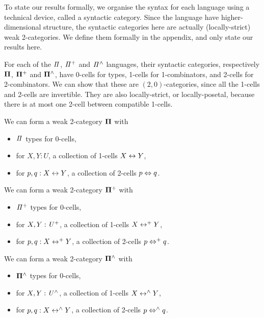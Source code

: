 To state our results formally, we organise the syntax for each language using a technical device, called a syntactic
category. Since the language have higher-dimensional structure, the syntactic categories here are actually
(locally-strict) weak 2-categories. We define them formally in the appendix, and only state our results here.

For each of the $\mathit{\Pi}$, $\mathit{{\Pi}^{+}}$ and $\mathit{{\Pi}^{\wedge}}$ languages, their syntactic categories, respectively $\mathbf{\Pi}$,
$\mathbf{\Pi^{+}}$ and $\mathbf{\Pi^{\wedge}}$, have 0-cells for types, 1-cells for 1-combinators, and 2-cells for 2-combinators. We can
show that these are $(2,0)$-categories, since all the 1-cells and 2-cells are invertible. They are also locally-strict,
or locally-posetal, because there is at most one 2-cell between compatible 1-cells.

\begin{toappendix}
  \begin{proposition}
    We can form a weak 2-category $\mathbf{\Pi}$ with
    \begin{itemize}
      \item $\mathit{\Pi}$ types for 0-cells,
      \item for $X, Y : U$, a collection of 1-cells $X \mathrel{\leftrightarrow} Y$,
      \item for $p, q : X \mathrel{\leftrightarrow} Y$, a collection of 2-cells $p \mathrel{\Leftrightarrow} q$.
    \end{itemize}
  \end{proposition}

  \begin{proposition}
    We can form a weak 2-category $\mathbf{\Pi^{+}}$ with
    \begin{itemize}
      \item $\mathit{{\Pi}^{+}}$ types for 0-cells,
      \item for $X, Y : \mathit{U}^{+}$, a collection of 1-cells $X \mathrel{\leftrightarrow^{+}} Y$,
      \item for $p, q : X \mathrel{\leftrightarrow^{+}} Y$, a collection of 2-cells $p \mathrel{\Leftrightarrow^{+}} q$.
    \end{itemize}
  \end{proposition}

  \begin{proposition}
    We can form a weak 2-category $\mathbf{\Pi^{\wedge}}$ with
    \begin{itemize}
      \item $\mathbf{\Pi^{\wedge}}$ types for 0-cells,
      \item for $X, Y : \mathit{{U}^{\wedge}}$, a collection of 1-cells $X \mathrel{\leftrightarrow^{\wedge}} Y$,
      \item for $p, q : X \mathrel{\leftrightarrow^{\wedge}} Y$, a collection of 2-cells $p \mathrel{\Leftrightarrow^{\wedge}} q$.
    \end{itemize}
  \end{proposition}
\end{toappendix}

